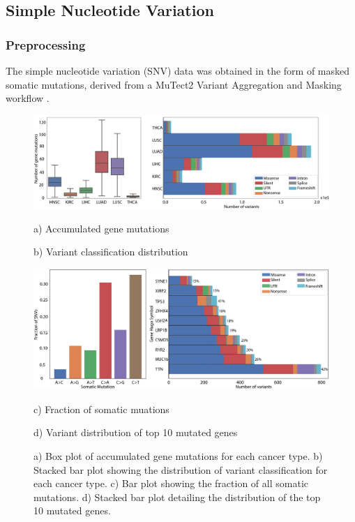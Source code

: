 \subsection{Simple Nucleotide Variation}

\subsubsection{Preprocessing}

The simple nucleotide variation (SNV) data was obtained in the form of masked somatic mutations, derived from a MuTect2 Variant Aggregation and Masking workflow \cite{cibulskis2013sensitive}. 

\begin{figure}[h!]
    \centering
    \includegraphics[width=\textwidth]{img/snvstats.png}
    \noindent
    \begin{minipage}[t]{.39\textwidth}
    \raggedright
        a) Accumulated gene mutations
    \end{minipage}%
    \hspace{1cm}
    \begin{minipage}[t]{.5\textwidth}
        b) Variant classification distribution
    \end{minipage}
    \centering
    \includegraphics[width=\textwidth]{img/snvstats2.png}
    \noindent
    \begin{minipage}[t]{.39\textwidth}
    \raggedright
        c) Fraction of somatic muations
    \end{minipage}%
    \hspace{1cm}
    \begin{minipage}[t]{.5\textwidth}
        d) Variant distribution of top 10 mutated genes
    \end{minipage}
    \caption{a) Box plot of accumulated gene mutations for each cancer type. b) Stacked bar plot showing the distribution of variant classification for each cancer type. c) Bar plot showing the fraction of all somatic mutations. d) Stacked bar plot detailing the distribution of the top 10 mutated genes.}
    \label{fig:snvstats}
\end{figure}



